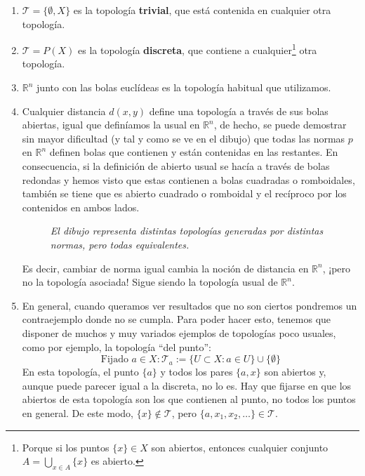 \begin{ej}
\begin{enumerate}
    \item \label{ejemplos_topologia:first} $\mathcal{T} = \{\emptyset, X\}$ es la topología \textbf{trivial}, que está contenida en cualquier otra topología.
    \item $\mathcal{T} = P\left( X \right)$ es la topología \textbf{discreta}, que contiene a cualquier\footnote{Porque si los puntos $\{x\} \in X$ son abiertos, entonces cualquier conjunto $A = \bigcup_{x \in A} \{x\}$ es abierto.} otra topología.
    \item $\mathbb{R}^n$ junto con las bolas euclídeas es la topología habitual que utilizamos.
    \item Cualquier distancia $d(x,y)$ define una topología a través de sus bolas abiertas, igual que definíamos la usual en $\mathbb{R}^n$, de hecho, se puede demostrar sin mayor dificultad (y tal y como se ve en el dibujo) que todas las normas $p$ en $\mathbb{R}^n$ definen bolas que contienen y están contenidas en las restantes. En consecuencia, si la definición de abierto usual se hacía a través de bolas redondas y hemos visto que estas contienen a bolas cuadradas o romboidales, también se tiene que es abierto cuadrado o romboidal y el recíproco por los contenidos en ambos lados.
    \begin{figure}[H]
        \centering
        \caption{\textit{El dibujo representa distintas topologías generadas por distintas normas, pero todas equivalentes.}}
        \label{fig:normas-topología}
    \end{figure}

    Es decir, cambiar de norma igual cambia la noción de distancia en $\mathbb{R}^n$, ¡pero no la topología asociada! Sigue siendo la topología usual de $\mathbb{R}^n$.
    
    \item En general, cuando queramos ver resultados que no son ciertos pondremos un contraejemplo donde no se cumpla. Para poder hacer esto, tenemos que disponer de muchos y muy variados ejemplos de topologías poco usuales, como por ejemplo, la topología ``del punto'':
    $$
    \mbox{Fijado } a \in X : \mathcal{T}_a := \{U \subset X: a \in U\} \cup \{\emptyset\} 
    $$
    En esta topología, el punto $\{a\}$ y todos los pares $\{a, x\}$ son abiertos y, aunque puede parecer igual a la discreta, no lo es. Hay que fijarse en que los abiertos de esta topología son los que contienen al punto, no todos los puntos en general. De este modo, $\{x\}\notin \mathcal{T}$, pero $\{a,x_1, x_2, \ldots\}\in \mathcal{T}$.
\end{enumerate}
\end{ej}

